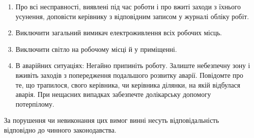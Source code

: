 \begin{enumerate}
 \item Про всі несправності, виявлені під час роботи і про вжиті заходи з їхнього усунення, доповісти керівнику з відповідним записом у журналі обліку робіт.
 \item Виключити загальний вимикач електроживлення всіх робочих місць.
 \item Виключити світло на робочому місці й у приміщенні.
 \item В аварійних ситуаціях:
  \subitem Негайно припиніть роботу.
  \subitem Залиште небезпечну зону і вживіть заходів з попередження подальшого розвитку аварії.
  \subitem Повідомте про те, що трапилося, свого керівника, чи керівника ділянки, на якій відбулася аварія. 
  \subitem При нещасних випадках забезпечте  долікарську допомогу потерпілому.
\end{enumerate}

За порушення чи невиконання цих вимог винні несуть відповідальність відповідно до чинного законодавства.
